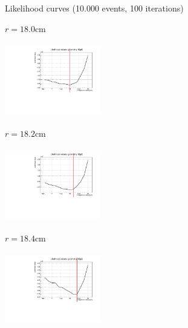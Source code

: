 \documentclass[handout,8 pt]{beamer}
\begin{document}
\begin{frame}{Likelihood curves (10.000 events, 100 iterations)}
\justifying
\begin{minipage}[c]{.32\textwidth}
\begin{exampleblock}{} \begin{center}$r = 18.0$cm\end{center} \end{exampleblock}
\includegraphics[width=4.2cm, height=3.2cm]{figs/likelihood100LowStat/likelihood18p0.pdf} 
\end{minipage}
\begin{minipage}[c]{.32\textwidth}
\begin{exampleblock}{} \begin{center}$r = 18.2$cm\end{center} \end{exampleblock}
\includegraphics[width=4.2cm, height=3.2cm]{figs/likelihood100LowStat/likelihood18p2.pdf} 
\end{minipage}
\begin{minipage}[c]{.32\textwidth}
\begin{exampleblock}{} \begin{center}$r = 18.4$cm\end{center} \end{exampleblock}
\includegraphics[width=4.2cm, height=3.2cm]{figs/likelihood100LowStat/likelihood18p4.pdf} 
\end{minipage}


\end{frame}
\end{document}
